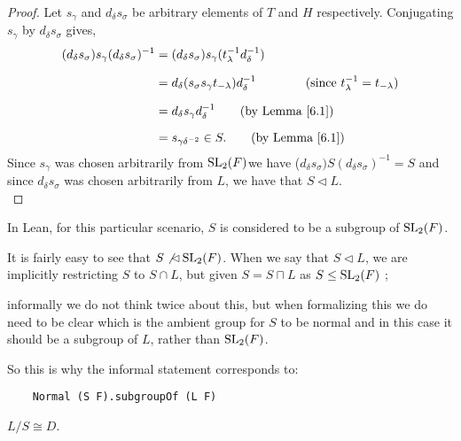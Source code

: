 \begin{proof}
    Let $s_\gamma$ and $d_\delta s_\sigma$ be arbitrary elements of $T$ and $H$ respectively. Conjugating $s_\gamma$ by $d_\delta s_\sigma$ gives,
\begin{align*} (d_\delta s_\sigma) s_\gamma (d_\delta s_\sigma)^{-1} &= (d_\delta s_\sigma) s_\gamma (t^{-1}_\lambda d^{-1}_\delta) \\[1.5ex]
&=
d_\delta (s_\sigma s_\gamma t_{-\lambda}) d^{-1}_\delta \qquad \tag{since $t^{-1}_\lambda=t_{-\lambda}$} \\[1.5ex] 
&=
d_\delta s_\gamma d^{-1}_\delta \tag{by Lemma \ref{6.1}} \\[1.5ex] 
&= s_{\gamma \delta^{-2}} \in S. \tag{by Lemma \ref{6.1}}
\end{align*}
Since $s_\gamma$ was chosen arbitrarily from $\operatorname{SL}_2(F)$we have ($d_\delta s_\sigma) S (d_\delta s_\sigma)^{-1} = S$ and since $d_\delta s_\sigma$ was chosen arbitrarily from $L$, we have that $S \vartriangleleft L$. \\
\end{proof}

\begin{remark}
    In Lean, for this particular scenario, $S$ is considered to be a subgroup of $\operatorname{SL}_2(F)$. 
    
    It is fairly easy to see that $S \not\lhd \operatorname{SL}_2(F)$. When we say that $S \lhd L$, we are implicitly restricting $S$ to $S \cap L$, but given  $S = S \sqcap L$ as $S \le \operatorname{SL}_2(F)$ ;
    
    informally we do not think twice about this, but when formalizing this we do need to be clear which is the ambient group for $S$ to be normal and in this case it should be a subgroup of $L$, rather than $\operatorname{SL}_2(F)$.
    
    So this is why the informal statement corresponds to:
    \begin{verbatim}
    Normal (S F).subgroupOf (L F) 
    \end{verbatim}
    
    \end{remark}


\begin{lemma}
    $L / S \cong D$.
\end{lemma}

